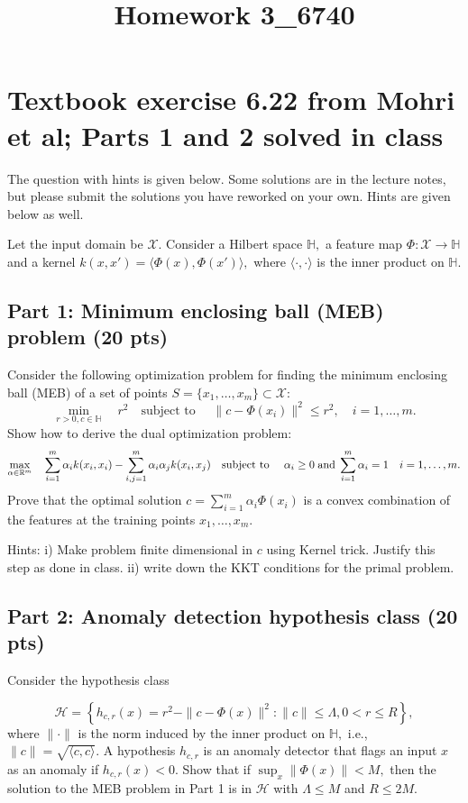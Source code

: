 \documentclass[12pt]{article}
\title{Homework 3_6740}
\begin{document}
\MakeScribeTop


\section*{Textbook exercise 6.22 from Mohri et al;  Parts 1 and 2 solved in class}

The question with hints is given below. Some solutions are in the lecture notes, but please submit the solutions you have reworked on your own. Hints are given below as well.

Let the input domain be $\mathcal{X}$.
Consider a Hilbert space $\mathbb{H},$ a feature map $\Phi:\mathcal{X}\to\mathbb{H}$ and a kernel $k(x,x') = \langle \Phi(x), \Phi(x')\rangle,$ where $\langle \cdot, \cdot\rangle$ is the inner product on $\mathbb{H}.$
\subsection*{Part 1: Minimum enclosing ball (MEB) problem (20 pts)}

Consider the following optimization problem for finding the minimum enclosing ball (MEB) of a set of points $S = \{x_1,\ldots,x_m\}\subset\mathcal{X}$:
\begin{equation}
\min_{r>0,c\in\mathbb{H}} \quad r^2 \quad \text{subject to } \quad \|c-\Phi(x_i)\|^2\leq r^2, \quad i=1,\ldots,m.
\end{equation}
Show how to derive the dual optimization problem:
\begin{equation}
	\max_{\alpha\in\mathbb{R}^m} \quad \sum_{i=1}^m \alpha_i k(x_i, x_i) - \sum_{i,j=1}^m \alpha_i\alpha_j k(x_i,x_j) \quad \text{subject to } \quad \alpha_i \geq 0 \;{\rm and}\; \sum_{i=1}^m \alpha_i = 1\quad i=1,\ldots,m.
\end{equation}
Prove that the optimal solution $c = \sum_{i=1}^m \alpha_i \Phi(x_i)$ is a convex combination of the features at the training points $x_1,\ldots,x_m.$ 

Hints: i) Make problem finite dimensional in $c$ using Kernel trick. Justify this step as done in class. ii) write down the KKT conditions for the primal problem. 


\subsection*{Part 2: Anomaly detection hypothesis class (20 pts)}

Consider the hypothesis class 

\begin{equation}
	\mathcal{H} = \left\{h_{c,r}(x) = r^2 - \|c-\Phi(x)\|^2:\|c\|\leq \Lambda, 0 < r \leq R\right\},
\end{equation}
where $\|\cdot\|$ is the norm induced by the inner product on $\mathbb{H},$ i.e., $\|c\| = \sqrt{\langle c,c\rangle}.$ A hypothesis $h_{c,r}$ is an anomaly detector that flags an input $x$ as an anomaly if $h_{c,r}(x) < 0.$
Show that if $\sup_x \|\Phi(x)\| < M,$ then the solution to the MEB problem in Part 1 is in $\mathcal{H}$ with $\Lambda \leq M$ and $R \leq 2M.$
\end{document}
